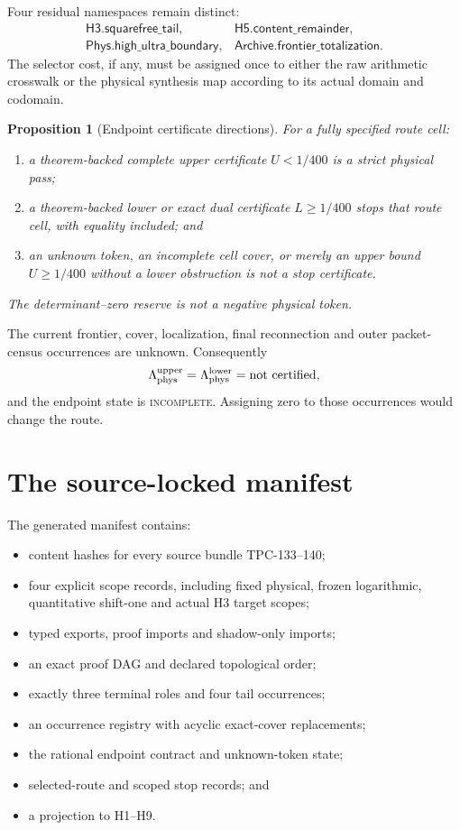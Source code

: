 \documentclass[11pt]{article}
\newtheorem{proposition}[theorem]{Proposition}
\theoremstyle{definition}
\theoremstyle{remark}
\begin{document}
Four residual namespaces remain distinct:
\[
\begin{array}{ll}
\mathsf{H3.squarefree\_tail},&
\mathsf{H5.content\_remainder},\\
\mathsf{Phys.high\_ultra\_boundary},&
\mathsf{Archive.frontier\_totalization}.
\end{array}
\]
The selector cost, if any, must be assigned once to either the raw
arithmetic crosswalk or the physical synthesis map according to its
actual domain and codomain.

\begin{proposition}[Endpoint certificate directions]
\label{prop:endpoint}
For a fully specified route cell:
\begin{enumerate}[label=(\alph*),leftmargin=2em]
\item a theorem-backed complete upper certificate
  \(U<1/400\) is a strict physical pass;
\item a theorem-backed lower or exact dual certificate
  \(L\ge1/400\) stops that route cell, with equality included; and
\item an unknown token, an incomplete cell cover, or merely an upper
  bound \(U\ge1/400\) without a lower obstruction is not a stop
  certificate.
\end{enumerate}
The determinant--zero reserve is not a negative physical token.
\end{proposition}

The current frontier, cover, localization, final reconnection and
outer packet-census occurrences are unknown.  Consequently
\[
 \Lambda_{\rm phys}^{\rm upper}
 =
 \Lambda_{\rm phys}^{\rm lower}
 =
 \text{not certified},
\]
and the endpoint state is \textsc{incomplete}.  Assigning zero to
those occurrences would change the route.

\section{The source-locked manifest}

The generated manifest contains:
\begin{itemize}[leftmargin=2em]
\item content hashes for every source bundle TPC-133--140;
\item four explicit scope records, including fixed physical,
  frozen logarithmic, quantitative shift-one and actual H3 target
  scopes;
\item typed exports, proof imports and shadow-only imports;
\item an exact proof DAG and declared topological order;
\item exactly three terminal roles and four tail occurrences;
\item an occurrence registry with acyclic exact-cover replacements;
\item the rational endpoint contract and unknown-token state;
\item selected-route and scoped stop records; and
\item a projection to H1--H9.
\end{itemize}
\end{document}
